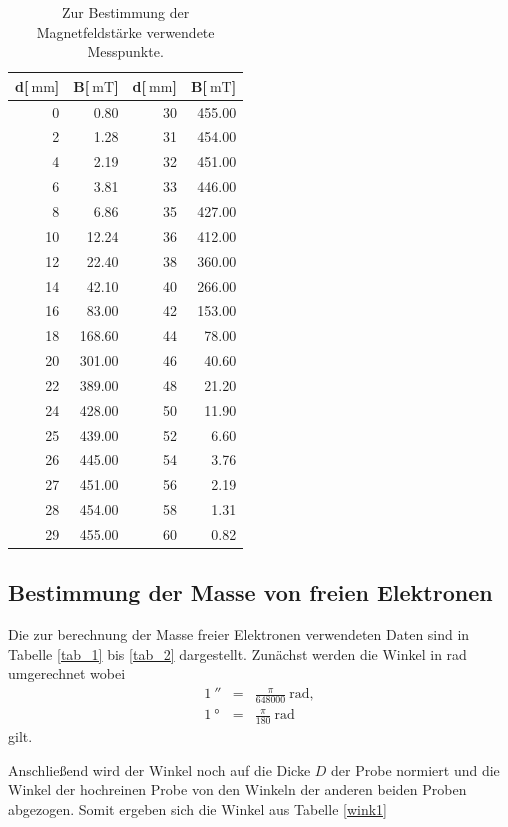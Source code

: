 \begin{table}
	\centering
	\caption[]{Zur Bestimmung der Magnetfeldstärke verwendete Messpunkte.}
	\begin{tabular}{r r r r}
		d[$\SI{}{\milli\meter}$] & B[$\SI{}{\milli\tesla}$] & d[$\SI{}{\milli\meter}$] & B[$\SI{}{\milli\tesla}$]\\
		\hline\hline
		 0	&	  0.80	&	30	&	455.00\\
		 2	&	  1.28	&	31	&	454.00\\
		 4	&	  2.19	&	32	&	451.00\\
		 6	&	  3.81	&	33	&	446.00\\
		 8	&	  6.86	&	35	&	427.00\\
		10	&	 12.24	&	36	&	412.00\\
		12	&	 22.40	&	38	&	360.00\\
		14	&	 42.10	&	40	&	266.00\\
		16	&	 83.00	&	42	&	153.00\\
		18	&	168.60	&	44	&	 78.00\\
		20	&	301.00	&	46	&	 40.60\\
		22	&	389.00	&	48	&	 21.20\\
		24	&	428.00	&	50	&	 11.90\\
		25	&	439.00	&	52	&	  6.60\\
		26	&	445.00	&	54	&	  3.76\\
		27	&	451.00	&	56	&	  2.19\\
		28	&	454.00	&	58	&	  1.31\\
		29	&	455.00	&	60	&	  0.82\\
		\hline
	\end{tabular}
	\label{tab_mag}
\end{table}
\FloatBarrier
\subsection{Bestimmung der Masse von freien Elektronen} %
\label{sub:bestimmung_der_masse_von_freien_elektronen}

Die zur berechnung der Masse freier Elektronen verwendeten Daten sind in Tabelle \ref{tab_1} bis \ref{tab_2} dargestellt.
Zunächst werden die Winkel in rad umgerechnet wobei
\begin{eqnarray*}
	1\SI{}{\arcsecond} &=& \frac{\pi}{648000}\SI{}{\radian},\\
	1\SI{}{\degree} &=& \frac{\pi}{180}\SI{}{\radian}
\end{eqnarray*}
gilt.

Anschließend wird der Winkel noch auf die Dicke $D$ der Probe normiert und die Winkel der hochreinen Probe von den Winkeln der anderen beiden Proben abgezogen.
Somit ergeben sich die Winkel aus Tabelle \ref{wink1}

